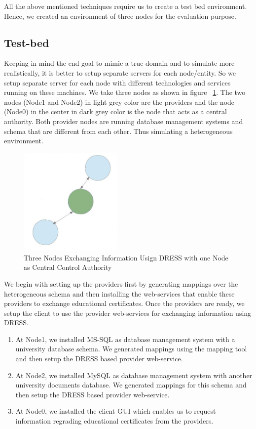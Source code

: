 \documentclass[12pt,a4paper,oneside]{book}
\begin{document}
	All the above mentioned techniques require us to create a test bed environment. Hence, we created an environment of three nodes for the evaluation purpose. \\
	
	\subsection{Test-bed}
	Keeping in mind the end goal to mimic a true domain and to simulate more realistically, it is better to setup separate servers for each node/entity. So we setup separate server for each node with different technologies and services running on these machines. We take three nodes as shown in figure ~\ref{fig:testbed}. The two nodes (Node1 and Node2) in light grey color are the providers and the node (Node0) in the center in dark grey color is the node that acts as a central authority. Both provider nodes are running database management systems and schema that are different from each other. Thus simulating a heterogeneous environment.
	
\begin{figure}[!htp]
  \centering
  \includegraphics[width=5cm]{architecture_distributed_testbed_exchange_through_hec.png}
  \caption{Three Nodes Exchanging Information Usign DRESS with one Node as Central Control Authority}
  \label{fig:testbed}
\end{figure}  

We begin with setting up the providers first by generating mappings over the heterogeneous schema and then installing the web-services that enable these providers to exchange educational certificates. Once the providers are ready, we setup the client to use the provider web-services for exchanging information using DRESS.

	\begin{enumerate}  

		\item At Node1, we installed MS-SQL as database management system with a university database schema. We generated mappings using the mapping tool and then setup the DRESS based provider web-service.

		\item At Node2, we installed MySQL as database management system with another university documents  database. We generated mappings for this schema and then setup the DRESS based provider web-service. 
	
		\item At Node0, we installed the client GUI which enables us to request information regrading educational certificates from the providers. 

	\end{enumerate}
	
\end{document}
